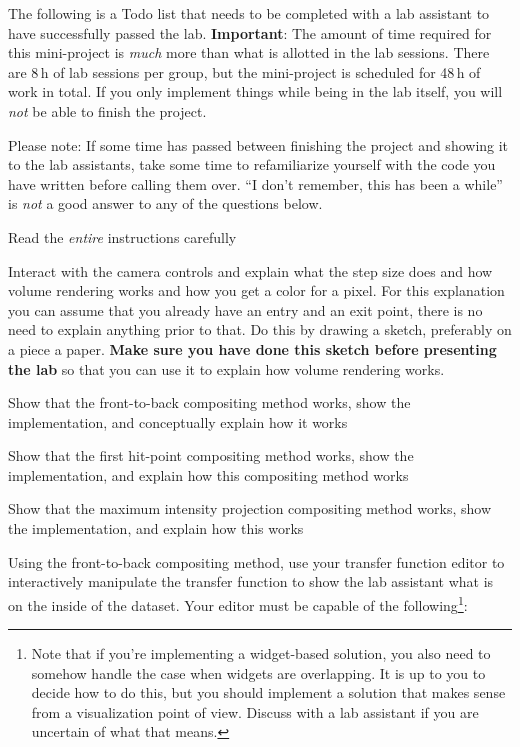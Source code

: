 \documentclass{labinstructions}
\begin{document}
The following is a Todo list that needs to be completed with a lab assistant to have successfully passed the lab.  \textbf{Important}:  The amount of time required for this mini-project is \emph{much} more than what is allotted in the lab sessions.  There are 8\,h of lab sessions per group, but the mini-project is scheduled for 48\,h of work in total.  If you only implement things while being in the lab itself, you will \emph{not} be able to finish the project.

Please note: If some time has passed between finishing the project and showing it to the lab assistants, take some time to refamiliarize yourself with the code you have written before calling them over.  ``I don't remember, this has been a while'' is \emph{not} a good answer to any of the questions below.
\begin{todolist}
  \item Read the \emph{entire} instructions carefully
  \item Interact with the camera controls and explain what the step size does and how volume rendering works and how you get a color for a pixel.  For this explanation you can assume that you already have an entry and an exit point, there is no need to explain anything prior to that.  Do this by drawing a sketch, preferably on a piece a paper. \textbf{Make sure you have done this sketch before presenting the lab} so that you can use it to explain how volume rendering works.
  \item Show that the front-to-back compositing method works, show the implementation, and conceptually explain how it works
  \item Show that the first hit-point compositing method works, show the implementation, and explain how this compositing method works
  \item Show that the maximum intensity projection compositing method works, show the implementation, and explain how this works
  \item Using the front-to-back compositing method, use your transfer function editor to interactively manipulate the transfer function to show the lab assistant what is on the inside of the dataset.
Your editor must be capable of the following\footnote{Note that if you're implementing a widget-based solution, you also need to somehow handle the case when widgets are overlapping. It is up to you to decide how to do this, but you should implement a solution that makes sense from a visualization point of view. Discuss with a lab assistant if you are uncertain of what that means. }:

\end{todolist}
\end{document}
